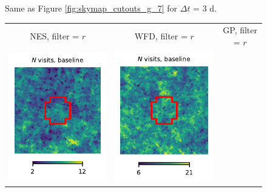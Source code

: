 \documentclass[preprintm,linenumbers]{aastex631}
\begin{document}
\begin{figure}
\begin{tabular}{  c c c}
			\end{tabular}
			\caption{
   Same as Figure \ref{fig:skymap_cutouts_g_7} for $\Delta t$ = 3 d. 
    }
	\label{fig:skymap_cutouts_g_3}
		\end{figure}

  
  	\begin{figure}
			\centering
			\begin{tabular}{  c c c}
                 NES, filter = $r$ & WFD, filter = $r$ & GP, filter = $r$ \\
				\includegraphics{results/skymaps_cutout/skymaps_cutout_first_year_one_snap_v4_0_10yrs_db_noDD_noTwi_nside-256_CountMetric_r_NES_noDD_noTwi.pdf} &
				\includegraphics{results/skymaps_cutout/skymaps_cutout_first_year_one_snap_v4_0_10yrs_db_noDD_noTwi_nside-256_CountMetric_r_WFD_noDD_noTwi.pdf} &

\end{tabular}
\end{figure}
\end{document}
